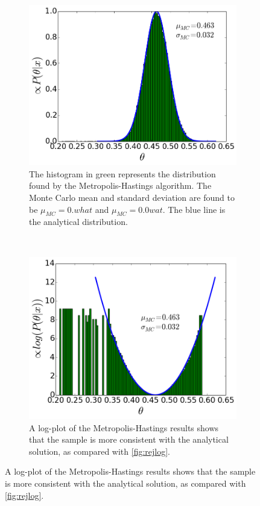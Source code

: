 \documentclass[a4paper,11pt,twoside]{article}
\begin{document}
\begin{figure}[ht]
	\centering
	\begin{subfigure}[t]{0.4\textwidth}
		\centering
		\includegraphics[width=\textwidth]{metropolishastings.png}
		\caption{The histogram in green represents the distribution
			found by the Metropolis-Hastings algorithm. The Monte Carlo mean and standard
			deviation are found to be $\mu_{MC} = 0.what$ and $\mu_{MC} = 0.0wat$.
			The blue line is the analytical distribution.}
		\label{fig:metropolis}
	\end{subfigure}
	~
	\begin{subfigure}[t]{0.4\textwidth}
		\centering
		\includegraphics[width=\textwidth]{mhlog.png}
		\caption{A log-plot of the Metropolis-Hastings results shows
		that the sample is more consistent with the analytical solution,
	as compared with \cref{fig:rejlog}.}
		\label{fig:mhlog}
	\end{subfigure}
	\label{fig:mhplots}
\end{figure}
\end{document}
